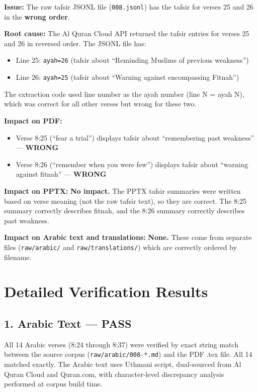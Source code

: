 \documentclass[11pt,a4paper]{article}
\begin{document}
\begin{failbox}
\textbf{Issue:} The raw tafsir JSONL file (\texttt{008.jsonl}) has the tafsir for verses 25 and 26 in the \textbf{wrong order}.

\textbf{Root cause:} The Al Quran Cloud API returned the tafsir entries for verses 25 and 26 in reversed order. The JSONL file has:
\begin{itemize}
\item Line 25: \texttt{ayah=26} (tafsir about ``Reminding Muslims of previous weakness'')
\item Line 26: \texttt{ayah=25} (tafsir about ``Warning against encompassing Fitnah'')
\end{itemize}

The extraction code used line number as the ayah number (line N = ayah N), which was correct for all other verses but wrong for these two.

\textbf{Impact on PDF:}
\begin{itemize}
\item Verse 8:25 (``fear a trial'') displays tafsir about ``remembering past weakness'' --- \textbf{WRONG}
\item Verse 8:26 (``remember when you were few'') displays tafsir about ``warning against fitnah'' --- \textbf{WRONG}
\end{itemize}

\textbf{Impact on PPTX:} \textbf{No impact.} The PPTX tafsir summaries were written based on verse meaning (not the raw tafsir text), so they are correct. The 8:25 summary correctly describes fitnah, and the 8:26 summary correctly describes past weakness.

\textbf{Impact on Arabic text and translations:} \textbf{None.} These come from separate files (\texttt{raw/arabic/} and \texttt{raw/translations/}) which are correctly ordered by filename.
\end{failbox}

\section*{Detailed Verification Results}

\subsection*{1. Arabic Text --- PASS}

All 14 Arabic verses (8:24 through 8:37) were verified by exact string match between the source corpus (\texttt{raw/arabic/008-*.md}) and the PDF .tex file. All 14 matched exactly. The Arabic text uses Uthmani script, dual-sourced from Al Quran Cloud and Quran.com, with character-level discrepancy analysis performed at corpus build time.
\end{document}
